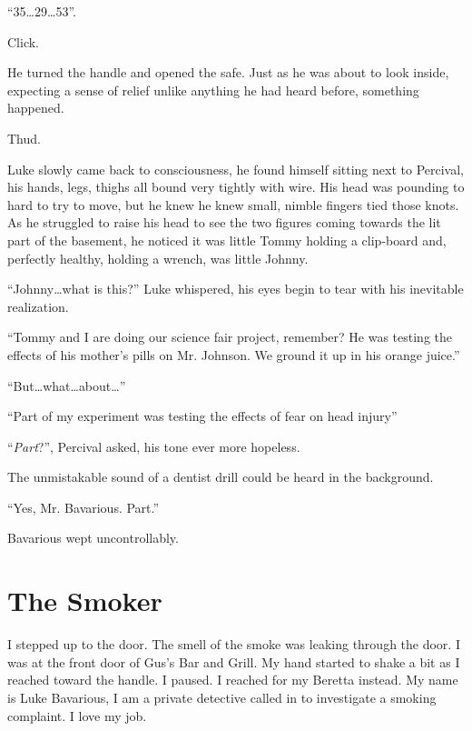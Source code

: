 ``35{\ldots}29{\ldots}53''.

Click.

He turned the handle and opened the safe. Just as he was about to
look inside, expecting a sense of relief unlike anything he had
heard before, something happened.

Thud.



Luke slowly came back to consciousness, he found himself sitting
next to Percival, his hands, legs, thighs all bound very tightly
with wire. His head was pounding to hard to try to move, but he
knew he knew small, nimble fingers tied those knots. As he
struggled to raise his head to see the two figures coming towards
the lit part of the basement, he noticed it was little Tommy
holding a clip-board and, perfectly healthy, holding a wrench, was
little Johnny.



``Johnny{\ldots}what is this?'' Luke whispered, his eyes
begin to tear with his inevitable realization.

``Tommy and I are doing our science fair project, remember? He
was testing the effects of his mother's pills on Mr. Johnson.
We ground it up in his orange juice.''

``But{\ldots}what{\ldots}about{\ldots}''

``Part of my experiment was testing the effects of fear on
head injury''

``{\em Part}?'', Percival asked, his tone ever more
hopeless.

The unmistakable sound of a dentist drill could be heard in the
background.

``Yes, Mr. Bavarious. Part.''

Bavarious wept uncontrollably. 
 





\chapter{The Smoker}

I stepped up to the door. The smell of the smoke was leaking
through the door. I was at the front door of Gus's Bar and
Grill. My hand started to shake a bit as I reached toward the
handle. I paused. I reached for my Beretta instead. My name is Luke
Bavarious, I am a private detective called in to investigate a
smoking complaint. I love my job.




